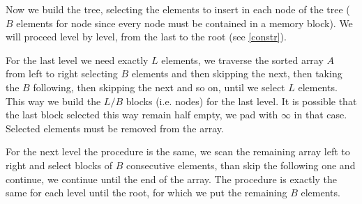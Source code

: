 \documentclass[a4paper]{article}
\begin{document}
Now we build the tree, selecting the elements to insert in each node of the tree ($B$ elements for node since every node must be contained in a memory block).
We will proceed level by level, from the last to the root (see \ref{constr}).

For the last level we need exactly $L$ elements, we traverse the sorted array $A$ from left to right selecting $B$ elements and then skipping the next, then taking the $B$ following, then skipping the next and so on, until we select $L$ elements.
This way we build the $L/B$ blocks (i.e. nodes) for the last level.
It is possible that the last block selected this way remain half empty, we pad with $\infty$ in that case.
Selected elements must be removed from the array.

For the next level the procedure is the same, we scan the remaining array left to right and select blocks of $B$ consecutive elements, than skip the following one and continue, we continue until the end of the array.
The procedure is exactly the same for each level until the root, for which we put the remaining $B$ elements.
\end{document}
